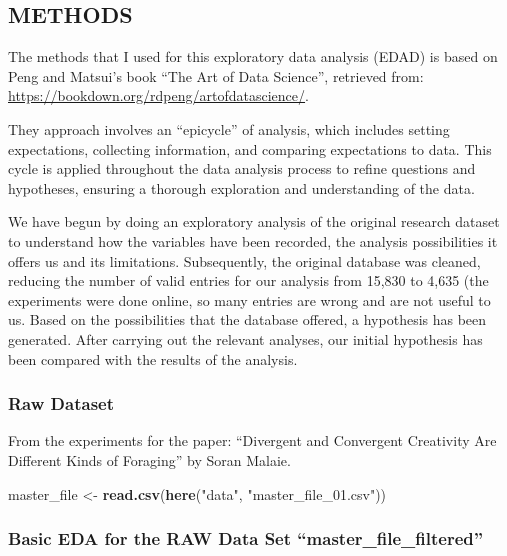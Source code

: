 \documentclass[
]{article}
\newenvironment{Shaded}{\begin{snugshade}}{\end{snugshade}}
\newcommand{\FunctionTok}[1]{\textcolor[rgb]{0.13,0.29,0.53}{\textbf{#1}}}
\newcommand{\NormalTok}[1]{#1}
\newcommand{\OtherTok}[1]{\textcolor[rgb]{0.56,0.35,0.01}{#1}}
\newcommand{\StringTok}[1]{\textcolor[rgb]{0.31,0.60,0.02}{#1}}
\begin{document}
\hypertarget{methods}{%
\subsection{METHODS}\label{methods}}

The methods that I used for this exploratory data analysis (EDAD) is
based on Peng and Matsui's book ``The Art of Data Science'', retrieved
from: \url{https://bookdown.org/rdpeng/artofdatascience/}.

They approach involves an ``epicycle'' of analysis, which includes
setting expectations, collecting information, and comparing expectations
to data. This cycle is applied throughout the data analysis process to
refine questions and hypotheses, ensuring a thorough exploration and
understanding of the data.

We have begun by doing an exploratory analysis of the original research
dataset to understand how the variables have been recorded, the analysis
possibilities it offers us and its limitations. Subsequently, the
original database was cleaned, reducing the number of valid entries for
our analysis from 15,830 to 4,635 (the experiments were done online, so
many entries are wrong and are not useful to us. Based on the
possibilities that the database offered, a hypothesis has been
generated. After carrying out the relevant analyses, our initial
hypothesis has been compared with the results of the analysis.

\hypertarget{raw-dataset}{%
\subsubsection{Raw Dataset}\label{raw-dataset}}

From the experiments for the paper: ``Divergent and Convergent
Creativity Are Different Kinds of Foraging'' by Soran Malaie.

\begin{Shaded}
\begin{Highlighting}[]
\NormalTok{master\_file }\OtherTok{\textless{}{-}} \FunctionTok{read.csv}\NormalTok{(}\FunctionTok{here}\NormalTok{(}\StringTok{"data"}\NormalTok{, }\StringTok{"master\_file\_01.csv"}\NormalTok{))}
\end{Highlighting}
\end{Shaded}

\hypertarget{basic-eda-for-the-raw-data-set-master_file_filtered}{%
\subsubsection{Basic EDA for the RAW Data Set
``master\_file\_filtered''}\label{basic-eda-for-the-raw-data-set-master_file_filtered}}
\end{document}
